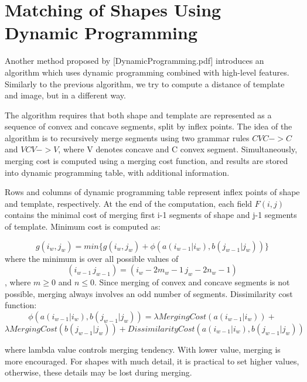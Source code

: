 \section{Matching of Shapes Using Dynamic Programming}
Another method proposed by [DynamicProgramming.pdf] introduces an algorithm  which uses dynamic programming combined with high-level features. Similarly to the previous algorithm, we try to compute a distance of template and image, but in a different way.

The algorithm requires that both shape and template are represented as a sequence of convex and concave segments, split by inflex points. The idea of the algorithm is to recursively merge segments using two grammar rules $CVC -> C$ and $VCV -> V$, where V denotes concave and C convex segment. Simultaneously, merging cost is computed using a merging cost function, and results are stored into dynamic programming table, with additional information.

Rows and columns of dynamic programming table represent inflex points of shape and template, respectively. At the end of the computation, each field $F(i,j)$ contains the minimal cost of merging first i-1 segments of shape and j-1 segments of template. Minimum cost is computed as:

\begin{equation*}
g(i_{w},j_{w}) = min\{g(i_{w},j_{w}) + \phi(a(i_{w-1}|i_{w}), b(j_{w-1}|j_{w}))\}
\end{equation*}
where the minimum is over all possible values of 
\begin{equation*}
(i_{w-1}\,j_{w-1})  =  (i_{w} - 2m_{w} -1\, j_{w} - 2n_{w} - 1)
\end{equation*}
, where $m \geq 0$ and $n \leq 0$.
Since merging of convex and concave segments is not possible, merging always involves an odd number of segments. Dissimilarity cost function: 
\begin{equation*}
\phi(a(i_{w-1}|i_{w}), b(j_{w-1}|j_{w}))  =  \lambda MergingCost(a(i_{w-1}|i_{w}))  +
\end{equation*}
\begin{equation*} 
\lambda MergingCost(b(j_{w-1}|j_{w}))  +  DissimilarityCost(a(i_{w-1}|i_{w}), b(j_{w-1}|j_{w}))
\end{equation*}

where lambda value controls merging tendency. With lower value, merging is more encouraged. For shapes with much detail, it is practical to set higher values, otherwise, these details may be lost during merging. 


